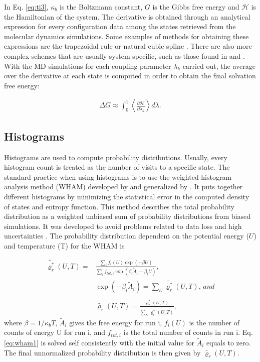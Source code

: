In Eq. \eqref{eq:ti3}, $\kappa_{b}$ is the Boltzmann constant, $G$ is the Gibbs free energy and $\mathcal{H}$ is the Hamiltonian of the system. The derivative is obtained through an analytical expression for every configuration data among the states retrieved from the molecular dynamics simulations. Some examples of methods for obtaining these expressions are the trapezoidal rule or natural cubic spline \cite{bareva}. There are also more complex schemes that are usually system specific, such as those found in  and . With the MD simulations for each coupling parameter $\lambda_{k}$ carried out, the average over the derivative at each state is computed in order to obtain the final solvation free energy:

\begin{equation}
\label{eq:ti4}
\begin{aligned}
\Delta G \approx \int _{0}^{1}  \left \langle \frac{\partial \mathcal{H}}{\partial \lambda _{k}}  \right \rangle d \lambda .
\end{aligned}
\end{equation}

\subsection{Histograms}
Histograms are used to compute probability distributions. Usually, every histogram count is treated as the number of visits to a specific state. The standard practice when using histograms is to use the weighted histogram analysis method (WHAM) developed by  and generalized by  \cite{freeenergy}. It puts together different histograms by minimizing the statistical error in the computed density of states and entropy function. This method describes the total probability distribution as a weighted unbiased sum of probability distributions from biased simulations. It was developed to avoid problems related to data loss and high uncertainties \cite{ROUX1995275}. The probability distribution dependent on the potential energy ($U$) and temperature (T)  for the WHAM is

\begin{equation}
\label{eq:wham1}
\begin{aligned}
\tilde{\varrho_{r}^{*}}(U,T)  {}=& \frac{\sum_{i} f_{i}(U) \exp(- \beta U)}{\sum_{i} f_{tot,i} \exp(\beta _{i} \tilde{A}_{i} -\beta _{i} U) }, \\
& \exp(- \beta _{i} \tilde{A}_{i})  = \sum_{U} \tilde{\varrho_{r}^{*}}(U,T), \, and \\
& \tilde{\varrho_{r}}(U,T) = \frac{\tilde{\varrho_{r}^{*}}(U,T)}{\sum_{U} \tilde{\varrho_{r}^{*}}(U,T)},
\end{aligned}
\end{equation}
where $\beta = 1/\kappa_{b}T$, $\tilde{A}_{i}$ gives the free energy for run i, $f_{i}(U)$ is the number of counts of energy U for run i, and $f_{tot,i}$ is the total number of counts in run i. Eq. \eqref{eq:wham1} is solved self consistently with the initial value for $\tilde{A}_{i}$ equals to zero. The final unnormalized probability distribution is then given by $\tilde{\varrho_{r}}(U,T)$.

